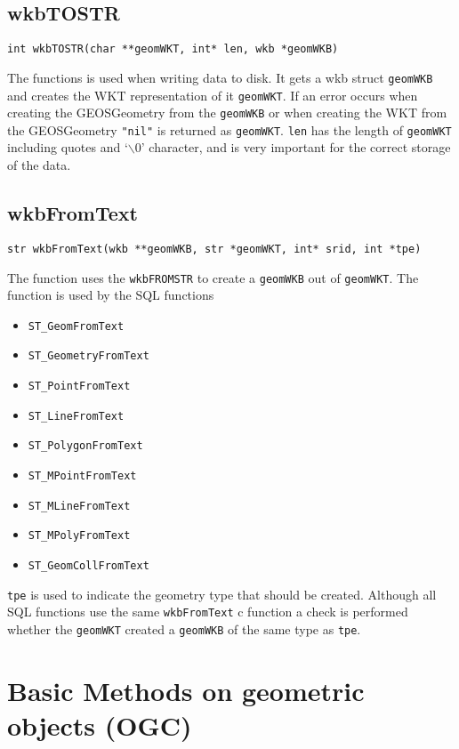 \documentclass{article}
\begin{document}
\subsection{wkbTOSTR}

{\tt int wkbTOSTR(char **geomWKT, int* len, wkb *geomWKB)}

\vspace{10pt}

\noindent
The functions is used when writing data to disk. It gets a wkb struct {\tt geomWKB} and creates
the WKT representation of it {\tt geomWKT}. If an error occurs when creating the GEOSGeometry from 
the {\tt geomWKB} or when creating the WKT from the GEOSGeometry {\tt "nil"} is returned as 
{\tt geomWKT}. {\tt *len} has the length of {\tt geomWKT} including quotes and `$\backslash$0' 
character, and is very important for the correct storage of the data.


\subsection{wkbFromText}

{\tt str wkbFromText(wkb **geomWKB, str *geomWKT, int* srid, int *tpe)}

\vspace{10pt}

\noindent
The function uses the {\tt wkbFROMSTR} to create a {\tt geomWKB} out of {\tt geomWKT}.
The function is used by the SQL functions
\begin{itemize}
\item {\tt ST\_GeomFromText}
\item {\tt ST\_GeometryFromText}
\item {\tt ST\_PointFromText}
\item {\tt ST\_LineFromText}
\item {\tt ST\_PolygonFromText}
\item {\tt ST\_MPointFromText}
\item {\tt ST\_MLineFromText}
\item {\tt ST\_MPolyFromText}
\item {\tt ST\_GeomCollFromText}
\end{itemize}
{\tt *tpe} is used to indicate the geometry type that should be created. Although all SQL
functions use the same {\tt wkbFromText} c function a check is performed whether the 
{\tt geomWKT} created a {\tt geomWKB} of the same type as {\tt *tpe}.


\section{Basic Methods on geometric objects (OGC)}
\end{document}
